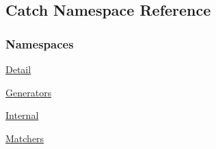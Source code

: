 \hypertarget{a00117}{}\subsection{Catch Namespace Reference}
\label{a00117}
\subsubsection*{Namespaces}
\begin{DoxyCompactItemize}
\item 
 \hyperlink{a00118}{Detail}
\item 
 \hyperlink{a00119}{Generators}
\item 
 \hyperlink{a00120}{Internal}
\item 
 \hyperlink{a00121}{Matchers}
\end{DoxyCompactItemize}
